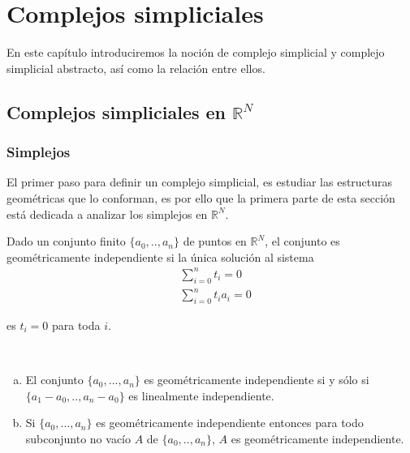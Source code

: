 \chapter{Complejos simpliciales}
En este capítulo introduciremos la noción de complejo simplicial y complejo simplicial abstracto, así como la relación entre ellos.
\section{Complejos simpliciales en $\mathbb{R}^N$}
\subsection{Simplejos}  
El primer paso para definir un complejo simplicial, es estudiar las estructuras geométricas que lo conforman, es por ello que la primera parte de esta sección está dedicada a analizar los simplejos en $\mathbb{R}^N$.           
\begin{Defi}
Dado un conjunto finito $\{a_0,..,a_n\}$ de puntos en $\mathbb{R}^{N}$, el conjunto es geométricamente independiente si la única solución al sistema 
\begin{equation}\label{s1}
    \begin{split}
     &\sum_{i=0}^{n}t_{i} = 0 \\
     &\sum_{i=0}^{n}t_{i}a_{i} = 0   
    \end{split}
\end{equation}

es $t_i = 0$ para toda $i$.
\end{Defi}

\begin{Teo}
~\begin{enumerate}[(a)]
    \item El conjunto $\{a_0,...,a_n\}$ es geométricamente independiente si y sólo si $\{a_1-a_0,..,a_n-a_0\}$ es linealmente independiente.
    \item Si $\{a_0,...,a_n\}$ es geométricamente independiente entonces para todo subconjunto no vacío $A$ de $\{a_0,..,a_n\}$, $A$ es geométricamente independiente.
\end{enumerate}
\end{Teo}

